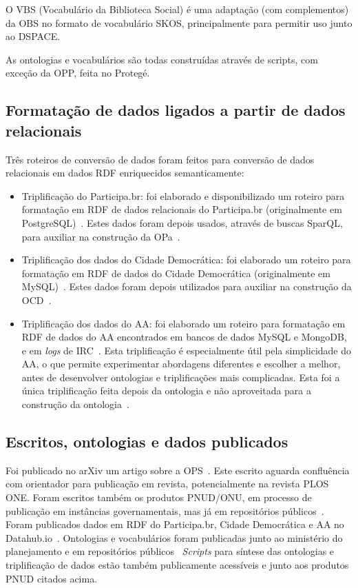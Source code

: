 \documentclass[a4paper,openright,12pt]{report} %
\begin{document}
O
VBS (Vocabulário da Biblioteca Social) é uma adaptação (com complementos)
            da OBS no formato
            de vocabulário SKOS, principalmente para permitir
            uso junto ao DSPACE.

As ontologias e vocabulários são todas construídas através de scripts, com exceção da
OPP, feita no Protegé.

\subsection{Formatação de dados ligados a partir de dados relacionais}
Três roteiros de conversão de dados foram feitos para conversão de dados relacionais em dados RDF enriquecidos semanticamente:
\begin{itemize}
    \item Triplificação do Participa.br: 
        foi elaborado e disponibilizado um roteiro para formatação em RDF de dados relacionais do Participa.br (originalmente em PostgreSQL)~\cite{triplificaParticipa}. Estes dados foram depois usados, através de buscas SparQL, para auxiliar na construção da OPa~\cite{opaScript}.
    \item Triplificação dos dados do Cidade Democrática: 
        foi elaborado um roteiro para formatação em RDF de dados 
        do Cidade Democrática (originalmente em MySQL)~\cite{cdScript}. Estes
        dados foram depois utilizados para auxiliar na construção
        da OCD~\cite{ocdScript}.
    \item Triplificação dos dados do AA:
        foi elaborado um roteiro para formatação em RDF de
        dados do AA encontrados em bancos de dados MySQL
        e MongoDB, e em \emph{logs} de IRC~\cite{aaScript}.
        Esta triplificação é especialmente útil pela
        simplicidade do AA, o que permite experimentar
        abordagens diferentes e escolher a melhor, antes
        de desenvolver ontologias e triplificações mais complicadas.
        Esta foi a única triplificação feita depois da ontologia e não aproveitada para a construção da ontologia~\cite{scriptOntologiaa}.
\end{itemize}


\subsection{Escritos, ontologias e dados publicados}
Foi publicado no arXiv um artigo sobre a OPS~\cite{ops}.
Este escrito aguarda confluência com orientador para publicação em revista, potencialmente na revista PLOS ONE.
Foram escritos também os produtos PNUD/ONU,
em processo de publicação em instâncias governamentais,
mas já em repositórios públicos~\cite{pnud3,pnud4,pnud5}.
Foram publicados dados em RDF do Participa.br, Cidade
Democrática e AA no Datahub.io~\cite{datahub}.
Ontologias e vocabulários foram publicadas junto ao ministério do planejamento
e em repositórios públicos~\cite{opa,opp,ops,obs,vbs}
\emph{Scripts} para síntese das ontologias e triplificação
de dados estão também publicamente acessíveis
e junto aos produtos PNUD citados acima.
\end{document}
